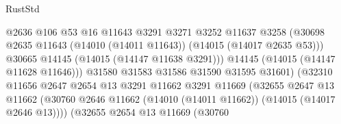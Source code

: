 \begin{lexlean}{RustStd}
\begin{coremodule}
                                              @2636
                                              @106
                                              @53
                                              @16
                                              @11643
                                              @3291
                                              @3271
                                              @3252
                                              @11637
                                              @3258
                                              (@30698
                                                @2635
                                                @11643
                                                (@14010 (@14011 @11643))
                                                (@14015 (@14017 @2635 @53)))
                                              @30665
                                              @14145
                                              (@14015 (@14147 @11638 @3291)))
                                            @14145
                                            (@14015 (@14147 @11628 @11646)))
                                          @31580
                                          @31583
                                          @31586
                                          @31590
                                          @31595
                                          @31601)
                                        (@32310
                                          @11656
                                          @2647
                                          @2654
                                          @13
                                          @3291
                                          @11662
                                          @3291
                                          @11669
                                          (@32655
                                            @2647
                                            @13
                                            @11662
                                            (@30760
                                              @2646
                                              @11662
                                              (@14010 (@14011 @11662))
                                              (@14015 (@14017 @2646 @13))))
                                          (@32655
                                            @2654
                                            @13
                                            @11669
                                            (@30760

\end{coremodule}
\end{lexlean}
